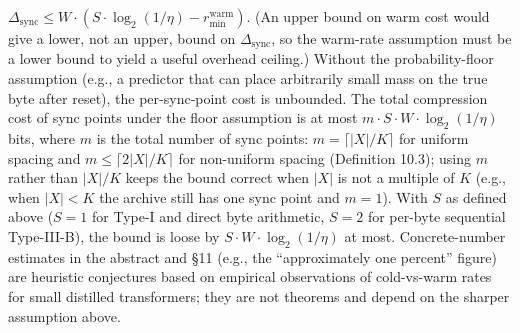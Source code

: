 \documentclass[
]{article}
\begin{document}
$\Delta_{\mathrm{sync}} \leq W \cdot (S \cdot \log_2(1/\eta) - r^{\mathrm{warm}}_{\min})$.
(An upper bound on warm cost would give a lower, not an upper,
bound on $\Delta_{\mathrm{sync}}$, so the warm-rate assumption must
be a lower bound to yield a useful overhead ceiling.) Without the
probability-floor assumption (e.g., a predictor that can place
arbitrarily small mass on the true byte after reset), the
per-sync-point cost is unbounded. The total compression cost of
sync points under the floor assumption is at most
$m \cdot S \cdot W \cdot \log_2(1/\eta)$ bits, where $m$ is the
total number of sync points: $m = \lceil |X|/K \rceil$ for uniform
spacing and $m \leq \lceil 2|X|/K \rceil$ for non-uniform spacing
(Definition 10.3); using $m$ rather than $|X|/K$ keeps the bound
correct when $|X|$ is not a multiple of $K$ (e.g., when $|X| < K$
the archive still has one sync point and $m = 1$). With $S$ as
defined above ($S = 1$ for Type-I and direct byte arithmetic,
$S = 2$ for per-byte sequential Type-III-B), the bound is loose
by $S \cdot W \cdot \log_2(1/\eta)$ at most.
Concrete-number estimates in the abstract and §11 (e.g., the
``approximately one percent'' figure) are heuristic conjectures
based on empirical observations of cold-vs-warm rates for small
distilled transformers; they are not theorems and depend on the
sharper assumption above.
\end{document}
